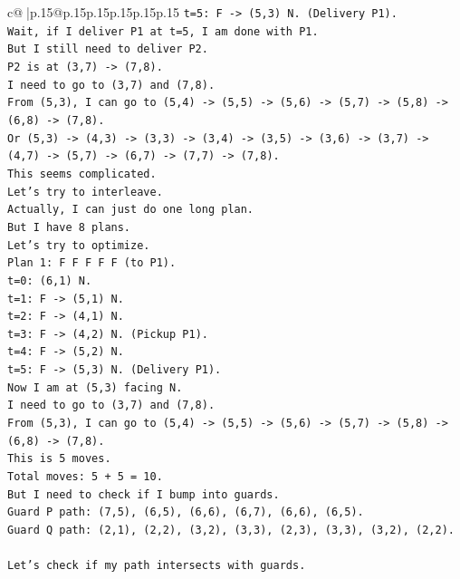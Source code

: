 \documentclass{article}
\begin{document}
{\begin{supertabular}{c@{$\;$}|p{.15\linewidth}@{}p{.15\linewidth}p{.15\linewidth}p{.15\linewidth}p{.15\linewidth}p{.15\linewidth}}
{{{\texttt{t=5: F {-}> (5,3) N. (Delivery P1).} \\
\texttt{Wait, if I deliver P1 at t=5, I am done with P1.} \\
\texttt{But I still need to deliver P2.} \\
\texttt{P2 is at (3,7) {-}> (7,8).} \\
\texttt{I need to go to (3,7) and (7,8).} \\
\texttt{From (5,3), I can go to (5,4) {-}> (5,5) {-}> (5,6) {-}> (5,7) {-}> (5,8) {-}> (6,8) {-}> (7,8).} \\
\texttt{Or (5,3) {-}> (4,3) {-}> (3,3) {-}> (3,4) {-}> (3,5) {-}> (3,6) {-}> (3,7) {-}> (4,7) {-}> (5,7) {-}> (6,7) {-}> (7,7) {-}> (7,8).} \\
\texttt{This seems complicated.} \\
\texttt{Let's try to interleave.} \\
\texttt{Actually, I can just do one long plan.} \\
\texttt{But I have 8 plans.} \\
\texttt{Let's try to optimize.} \\
\texttt{Plan 1: F F F F F (to P1).} \\
\texttt{t=0: (6,1) N.} \\
\texttt{t=1: F {-}> (5,1) N.} \\
\texttt{t=2: F {-}> (4,1) N.} \\
\texttt{t=3: F {-}> (4,2) N. (Pickup P1).} \\
\texttt{t=4: F {-}> (5,2) N.} \\
\texttt{t=5: F {-}> (5,3) N. (Delivery P1).} \\
\texttt{Now I am at (5,3) facing N.} \\
\texttt{I need to go to (3,7) and (7,8).} \\
\texttt{From (5,3), I can go to (5,4) {-}> (5,5) {-}> (5,6) {-}> (5,7) {-}> (5,8) {-}> (6,8) {-}> (7,8).} \\
\texttt{This is 5 moves.} \\
\texttt{Total moves: 5 + 5 = 10.} \\
\texttt{But I need to check if I bump into guards.} \\
\texttt{Guard P path: (7,5), (6,5), (6,6), (6,7), (6,6), (6,5).} \\
\texttt{Guard Q path: (2,1), (2,2), (3,2), (3,3), (2,3), (3,3), (3,2), (2,2).} \\
\\ 
\texttt{Let's check if my path intersects with guards.} \\
}}}
\end{supertabular}}
\end{document}
